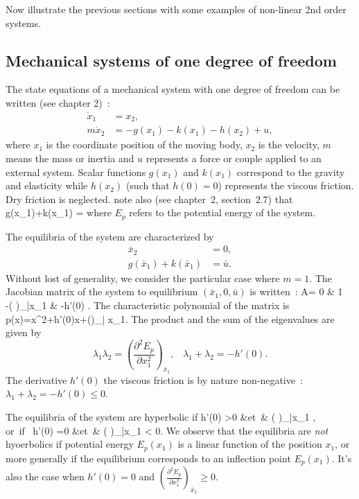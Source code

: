 Now illustrate the previous sections with some examples of non-linear 2nd order systems.




\subsection{Mechanical systems of one degree of freedom}

The state equations of a mechanical system with one degree of freedom can be written (see chapter 2)~:
\begin{align*}
\dot x_1&=x_2,\\
m\dot x_2&=-g(x_1) -k(x_1)-h(x_2) + u,
\end{align*}
where $x_1$ 
is the coordinate position of the moving body, $x_2$ is the velocity, $m$ means the mass or inertia and $u$ represents a force or couple applied to an external system. Scalar functions $g(x_1)$ and $k(x_1)$ 
correspond to the gravity and elasticity while $h(x_2)$ (such that $h(0)=0$) represents the viscous friction. Dry friction is neglected. note also (see chapter~2, section~2.7) that 
\eqnn
g(x_1)+k(x_1) = 
\eeqnn
where $E_p$ refers to the potential energy of the system. 

The equilibria of the system are characterized by
\begin{align*}
\bar x_2 &= 0,\\
g(\bar x_1)+k(\bar x_1) &= \bar u.
\end{align*}
Without lost of generality, we consider the particular case where $m=1$. 
The Jacobian matrix of the system to equilibrium $(\bar x_1, 0,\bar
u)$ is written~: 
\eqnn
 A= 0 & 1\\-\left (\right
)_{\bar x_1} & -h'(0) \ema.
\eeqnn
The characteristic polynomial of the matrix is
\eqnn
p(x)=x^2+h'(0)x+\left (\right )_{\bar
x_1}.
\eeqnn
 The product and the sum of the eigenvalues are given by
$$ \lambda_1\lambda_2=\left (\frac{\partial^2E_p}{\partial x_1^2}\right
)_{\bar x_1}, \;\;\; \lambda_1+\lambda_2=-h'(0).$$
The derivative $h'(0)$ the viscous friction is by nature non-negative~: $\lambda_1+\lambda_2 =-h'(0) \leq 0$.




The equilibria of the system are hyperbolic if
 \eqnn 
h'(0) >0 &\mbox{et }&  \left (\right
)_{\bar x_1} ,\\
 \mbox{or if }  h'(0) =0 &\mbox{et }& \left (\right
)_{\bar x_1} < 0.
\eeqnn
We observe that the equilibria are {\em not } hyoerbolics if potential energy $E_p(x_1)$ is a linear function of the position $x_1$, or more generally if the equilibrium corresponds to an inflection point $E_p(x_1)$. It's also the case when $h'(0)=0$ and $\left (\frac{\partial^2E_p}{\partial
x_1^2}\right )_{\bar x_1} \geq 0$.

